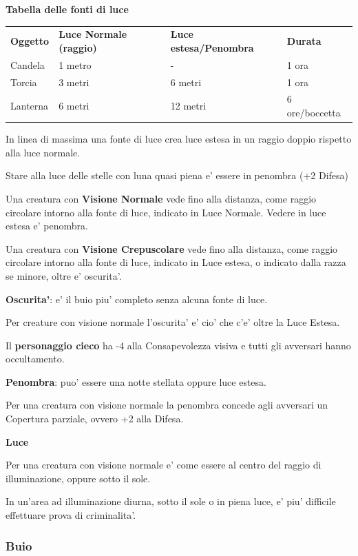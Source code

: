 \documentclass[a4paper,11pt,twoside,openany]{book}
\begin{document}
{\textbf{Tabella delle fonti di luce}

\medskip


\begin{tabular}{llll}
\toprule
\textbf{Oggetto} & \textbf{Luce Normale (raggio)} & \textbf{Luce estesa/Penombra} & \textbf{Durata}\tabularnewline
Candela & 1 metro & - & 1 ora\tabularnewline
Torcia & 3 metri & 6 metri & 1 ora\tabularnewline
Lanterna & 6 metri & 12 metri & 6 ore/boccetta\tabularnewline
\end{tabular}

\bigskip

In linea di massima una fonte di luce crea luce estesa in un raggio doppio rispetto alla luce normale.

Stare alla luce delle stelle con luna quasi piena e' essere in penombra (+2 Difesa)

Una creatura con \textbf{Visione Normale} vede fino alla distanza, come raggio circolare intorno alla fonte di luce, indicato in Luce Normale. Vedere in luce estesa e' penombra.

Una creatura con \textbf{Visione Crepuscolare} vede fino alla distanza, come raggio circolare intorno alla fonte di luce, indicato in Luce estesa, o indicato dalla razza se minore, oltre e' oscurita'.

\textbf{Oscurita'}: e' il buio piu' completo senza alcuna fonte di luce.

Per creature con visione normale l'oscurita' e' cio' che c'e' oltre la Luce Estesa.

Il \textbf{personaggio cieco} ha -4 alla Consapevolezza visiva e tutti gli avversari hanno occultamento.

\textbf{Penombra}: puo' essere una notte stellata oppure luce estesa.

Per una creatura con visione normale la penombra concede agli avversari
un Copertura parziale, ovvero +2 alla Difesa.

\textbf{Luce}

Per una creatura con visione normale e' come essere al centro del raggio di illuminazione, oppure sotto il sole.

In un'area ad illuminazione diurna, sotto il sole o in piena luce, e' piu' difficile effettuare prova di criminalita'.

\subsubsection{Buio}

}
\end{document}
